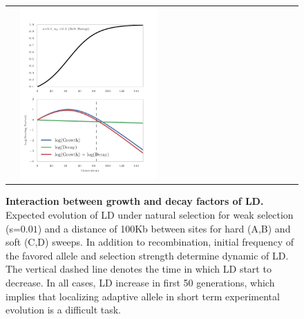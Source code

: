 \begin{figure}[H]
\begin{tabular}{l|l}
		&\includegraphics[width=0.5\textwidth]{figures/decayFactors3}		
	\end{tabular}
	
	\caption{{\bf Interaction between growth and decay factors of LD.}\\
		Expected evolution of LD under natural 
		selection for weak selection (s=$0.01$) and a distance of 100Kb between 
		sites for hard (A,B) and soft (C,D) sweeps. In addition to 
		recombination, initial frequency of the favored allele and selection 
		strength determine dynamic of LD. The vertical dashed line denotes the 
		time in which LD start to decrease. In all cases, LD increase in first 
		50 generations, which implies that localizing adaptive allele in short 
		term experimental evolution is a difficult task.} \label{fig:ldf}
\end{figure}



